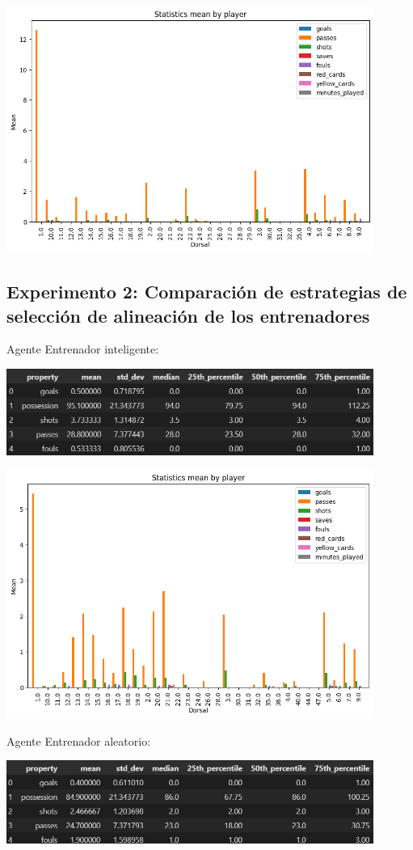 \documentclass{article}
\begin{document}
\includegraphics[width=0.9\textwidth,height=0.5\textwidth]{smart_vs_random_player_away.png}                       

\subsection{Experimento 2: Comparación de estrategias de selección de alineación de los entrenadores}
Agente Entrenador inteligente:

\includegraphics[width=0.9\textwidth]{tabla3.PNG}

\includegraphics[width=0.9\textwidth,height=0.5\textwidth]{smart_vs_random_line_up_home.png}

Agente Entrenador aleatorio:

\includegraphics[width=0.9\textwidth]{tabla4.PNG}
\end{document}
